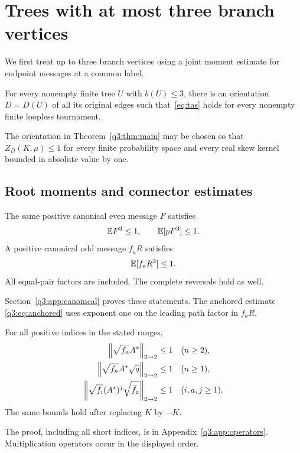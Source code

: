 
\section{Trees with at most three branch vertices}\label{sec:three}
We first treat up to three branch vertices using a joint moment estimate for endpoint messages at a common label.
\begin{theorem}\label{q3:thm:main}
For every nonempty finite tree $U$ with $b(U)\le3$, there is an orientation $D=D(U)$ of all its original edges such that~\eqref{eq:tas} holds for every nonempty finite loopless tournament.
\end{theorem}
\begin{theorem}\label{q3:thm:kernel}
The orientation in Theorem~\ref{q3:thm:main} may be chosen so that $Z_D(K,\mu)\le1$ for every finite probability space and every real skew kernel bounded in absolute value by one.
\end{theorem}
\subsection{Root moments and connector estimates}\label{q3:sec:interfaces}
\begin{proposition}\label{q3:prop:canonical}
The same positive canonical even message $F$ satisfies
\begin{equation}\label{q3:eq:evencubic}
 \mathbb E F^3\le1,\qquad \mathbb E[pF^3]\le1.
\end{equation}
A positive canonical odd message $f_aR$ satisfies
\begin{equation}\label{q3:eq:anchored}
 \mathbb E[f_aR^3]\le1.
\end{equation}
All equal-pair factors are included. The complete reversals hold as well.
\end{proposition}
Section~\ref{q3:app:canonical} proves these statements. The anchored estimate \eqref{q3:eq:anchored} uses exponent one on the leading path factor in $f_aR$.

\begin{proposition}\label{q3:prop:operators}
For all positive indices in the stated ranges,
\begin{align}
 \left\lVert\sqrt{f_n}A^*\right\rVert_{2\to2}&\le1 &&(n\ge2),\label{q3:eq:half}\\
 \left\lVert\sqrt{f_n}A^*\sqrt q\right\rVert_{2\to2}&\le1 &&(n\ge1),\label{q3:eq:mixed}\\
 \left\lVert\sqrt{f_i}(A^*)^j\sqrt{\bar f_a}\right\rVert_{2\to2}&\le1 &&(i,a,j\ge1).\label{q3:eq:opposite}
\end{align}
The same bounds hold after replacing $K$ by $-K$.
\end{proposition}
The proof, including all short indices, is in Appendix~\ref{q3:app:operators}. Multiplication operators occur in the displayed order.

